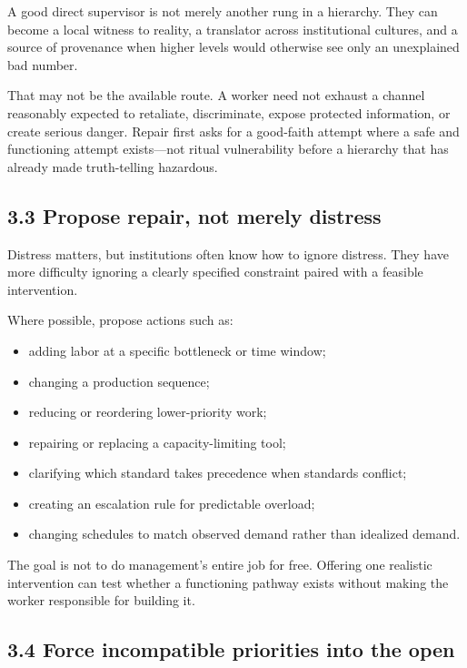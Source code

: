 \documentclass[11pt,oneside]{article}
\providecommand{\tightlist}{%
  \setlength{\itemsep}{0.22em}\setlength{\parskip}{0pt}}
\begin{document}
A good direct supervisor is not merely another rung in a hierarchy. They
can become a local witness to reality, a translator across institutional
cultures, and a source of provenance when higher levels would otherwise
see only an unexplained bad number.

That may not be the available route. A worker need not exhaust a channel
reasonably expected to retaliate, discriminate, expose protected
information, or create serious danger. Repair first asks for a
good-faith attempt where a safe and functioning attempt exists---not
ritual vulnerability before a hierarchy that has already made
truth-telling hazardous.

\hypertarget{propose-repair-not-merely-distress}{%
\subsection{3.3 Propose repair, not merely
distress}\label{propose-repair-not-merely-distress}}

Distress matters, but institutions often know how to ignore distress.
They have more difficulty ignoring a clearly specified constraint paired
with a feasible intervention.

Where possible, propose actions such as:

\begin{itemize}
\tightlist
\item
  adding labor at a specific bottleneck or time window;
\item
  changing a production sequence;
\item
  reducing or reordering lower-priority work;
\item
  repairing or replacing a capacity-limiting tool;
\item
  clarifying which standard takes precedence when standards conflict;
\item
  creating an escalation rule for predictable overload;
\item
  changing schedules to match observed demand rather than idealized
  demand.
\end{itemize}

The goal is not to do management's entire job for free. Offering one
realistic intervention can test whether a functioning pathway exists
without making the worker responsible for building it.

\hypertarget{force-incompatible-priorities-into-the-open}{%
\subsection{3.4 Force incompatible priorities into the
open}\label{force-incompatible-priorities-into-the-open}}
\end{document}
